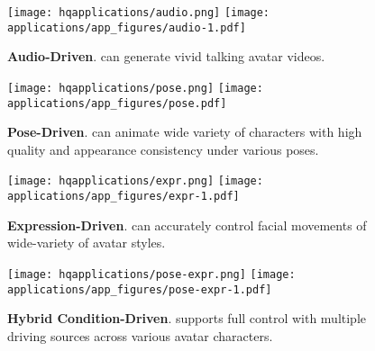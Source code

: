 


\begin{figure}
    \centering
    \ifhq
    \texttt{[image: hqapplications/audio.png]}
    \else
    \texttt{[image: applications/app\_figures/audio-1.pdf]}
    \fi
    \caption{\textbf{Audio-Driven}. {\nameofmethod} can generate vivid talking avatar videos.}
    \label{fig:application-audio}
\end{figure}

\begin{figure}
    \centering
    \ifhq
    \texttt{[image: hqapplications/pose.png]}
    \else
    \texttt{[image: applications/app\_figures/pose.pdf]}
    \fi
    \caption{\textbf{Pose-Driven}. {\nameofmethod} can animate wide variety of characters with high quality and appearance consistency under various poses.}
    \label{fig:application-pose}
\end{figure}


\begin{figure}
    \centering
    \ifhq
    \texttt{[image: hqapplications/expr.png]}
    \else
    \texttt{[image: applications/app\_figures/expr-1.pdf]}
    \fi
    \caption{\textbf{Expression-Driven}. {\nameofmethod} can accurately control facial movements of wide-variety of avatar styles.}
    \label{fig:application-expr}
\end{figure}

\begin{figure}[h]
    \centering
    \ifhq
    \texttt{[image: hqapplications/pose-expr.png]}
    \else
    \texttt{[image: applications/app\_figures/pose-expr-1.pdf]}
    \fi
    \caption{\textbf{Hybrid Condition-Driven}. {\nameofmethod} supports full control with multiple driving sources across various avatar characters.}
    \label{fig:application-pose-expr}
\end{figure}